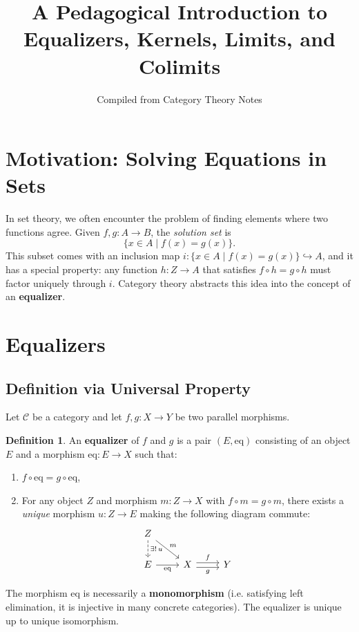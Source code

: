 \documentclass{article}
\title{A Pedagogical Introduction to Equalizers, Kernels, Limits, and Colimits}
\author{Compiled from Category Theory Notes}
\date{}
\theoremstyle{definition}
\newtheorem{definition}{Definition}[section]
\begin{document}
\maketitle

\tableofcontents

\section{Motivation: Solving Equations in Sets}
In set theory, we often encounter the problem of finding elements where two functions agree. Given $f, g : A \to B$, the \emph{solution set} is
\[
\{ x \in A \mid f(x) = g(x) \}.
\]
This subset comes with an inclusion map $i : \{ x \in A \mid f(x) = g(x) \} \hookrightarrow A$, and it has a special property: any function $h : Z \to A$ that satisfies $f \circ h = g \circ h$ must factor uniquely through $i$. Category theory abstracts this idea into the concept of an \textbf{equalizer}.

\section{Equalizers}
\subsection{Definition via Universal Property}
Let $\mathcal{C}$ be a category and let $f, g : X \to Y$ be two parallel morphisms.

\begin{definition}
An \textbf{equalizer} of $f$ and $g$ is a pair $(E, \mathrm{eq})$ consisting of an object $E$ and a morphism $\mathrm{eq} : E \to X$ such that:
\begin{enumerate}
    \item $f \circ \mathrm{eq} = g \circ \mathrm{eq}$,
    \item For any object $Z$ and morphism $m : Z \to X$ with $f \circ m = g \circ m$, there exists a \emph{unique} morphism $u : Z \to E$ making the following diagram commute:
    \[
    \begin{tikzcd}
    Z \arrow[dr, "m"] \arrow[d, dashed, "\exists!\, u"] & \\
    E \arrow[r, "\mathrm{eq}"'] & X \arrow[r, shift left, "f"] \arrow[r, shift right, "g"'] & Y
    \end{tikzcd}
    \]
\end{enumerate}
\end{definition}

The morphism $\mathrm{eq}$ is necessarily a \textbf{monomorphism} (i.e. satisfying left elimination, it is injective in many concrete categories). The equalizer is unique up to unique isomorphism.
\end{document}

